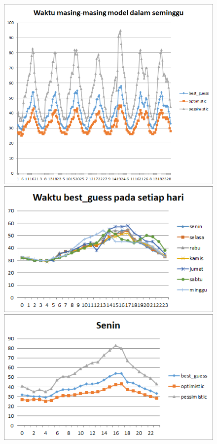 \begin{figure}[H]
				\centering		
				\includegraphics[scale=0.7]{Gambar/waktuallmodelsampel217072017normal.png}
				\includegraphics[]{Gambar/waktubestguesssampel217072017normal.png}
				\includegraphics[]{Gambar/seninsampel217072017normal.png}
\end{figure}
			
